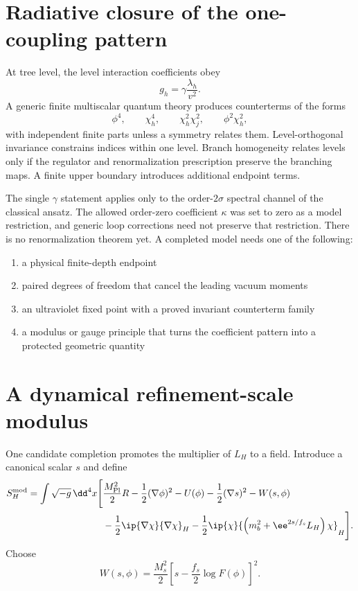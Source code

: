 \section{Radiative closure of the one-coupling pattern}

At tree level, the level interaction coefficients obey
\begin{equation}
g_h=\gamma\frac{\lambda_h}{v^2}.
\end{equation}
A generic finite multiscalar quantum theory produces counterterms of the forms
\begin{equation}
\phi^4,
\qquad
\chi_h^4,
\qquad
\chi_h^2\chi_j^2,
\qquad
\phi^2\chi_h^2,
\end{equation}
with independent finite parts unless a symmetry relates them.  Level-orthogonal invariance constrains indices within one level.  Branch homogeneity relates levels only if the regulator and renormalization prescription preserve the branching maps.  A finite upper boundary introduces additional endpoint terms.

The single $\gamma$ statement applies only to the order-$2\sigma$ spectral channel of the classical ansatz.  The allowed order-zero coefficient $\kappa$ was set to zero as a model restriction, and generic loop corrections need not preserve that restriction.  There is no renormalization theorem yet.  A completed model needs one of the following:
\begin{enumerate}[leftmargin=2.2em]
\item a physical finite-depth endpoint
\item paired degrees of freedom that cancel the leading vacuum moments
\item an ultraviolet fixed point with a proved invariant counterterm family
\item a modulus or gauge principle that turns the coefficient pattern into a protected geometric quantity
\end{enumerate}

\section{A dynamical refinement-scale modulus}

One candidate completion promotes the multiplier of $L_H$ to a field.  Introduce a canonical scalar $s$ and define
\begin{equation}
\begin{aligned}
S_H^{\mathrm{mod}}=\int\sqrt{-g}\,\dd^4x\Bigg[
&\frac{M_{\mathrm{Pl}}^2}{2}R
-\frac12(\nabla\phi)^2-U(\phi)
-\frac12(\nabla s)^2-W(s,\phi)\\
&-\frac12\ip{\nabla\chi}{\nabla\chi}_H
-\frac12\ip{\chi}{\left(m_b^2+\ee^{2s/f_s}L_H\right)\chi}_H
\Bigg].
\end{aligned}
\label{eq:rad-modulus-action}
\end{equation}
Choose
\begin{equation}
W(s,\phi)
=\frac{M_s^2}{2}
\left[
s-\frac{f_s}{2}\log F(\phi)
\right]^2.
\label{eq:rad-modulus-potential}
\end{equation}

